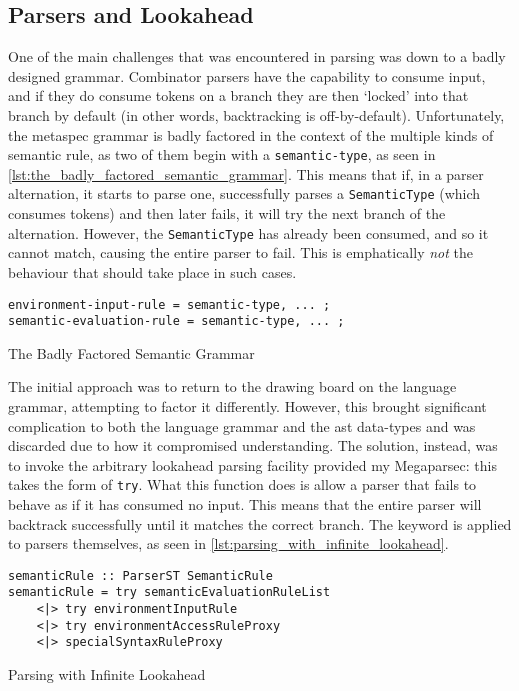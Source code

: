 \subsection{Parsers and Lookahead} %
\label{sub:parsers_and_lookahead}
One of the main challenges that was encountered in parsing was down to a badly designed grammar. 
Combinator parsers have the capability to consume input, and if they do consume tokens on a branch they are then `locked' into that branch by default (in other words, backtracking is off-by-default).
Unfortunately, the \gls{metaspec} grammar is badly factored in the context of the multiple kinds of semantic rule, as two of them begin with a \texttt{semantic-type}, as seen in \autoref{lst:the_badly_factored_semantic_grammar}.
This means that if, in a parser alternation, it starts to parse one, successfully parses a \texttt{SemanticType} (which consumes tokens) and then later fails, it will try the next branch of the alternation.
However, the \texttt{SemanticType} has already been consumed, and so it cannot match, causing the entire parser to fail. 
This is emphatically \textit{not} the behaviour that should take place in such cases. 

\begin{listing}[!htb]
\begin{verbatim}
environment-input-rule = semantic-type, ... ;
semantic-evaluation-rule = semantic-type, ... ;
\end{verbatim}
\caption{The Badly Factored Semantic Grammar}
\label{lst:the_badly_factored_semantic_grammar}
\end{listing}

The initial approach was to return to the drawing board on the language grammar, attempting to factor it differently. 
However, this brought significant complication to both the language grammar and the \gls{ast} data-types and was discarded due to how it compromised understanding. 
The solution, instead, was to invoke the arbitrary lookahead parsing facility provided my Megaparsec: this takes the form of \texttt{try}. 
What this function does is allow a parser that fails to behave as if it has consumed no input. 
This means that the entire parser will backtrack successfully until it matches the correct branch.
The keyword is applied to parsers themselves, as seen in \autoref{lst:parsing_with_infinite_lookahead}.

\begin{listing}[!htb]
\begin{verbatim}
semanticRule :: ParserST SemanticRule
semanticRule = try semanticEvaluationRuleList
    <|> try environmentInputRule
    <|> try environmentAccessRuleProxy
    <|> specialSyntaxRuleProxy
\end{verbatim}
\caption{Parsing with Infinite Lookahead}
\label{lst:parsing_with_infinite_lookahead}
\end{listing}

